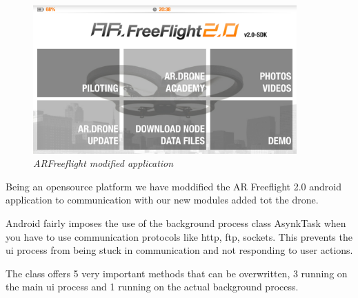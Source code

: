 \begin{figure}[ht]
\begin{center}
\includegraphics[width=0.9\textwidth]{implementation/android_app.png}
\end{center}
\caption{\small \itshape{ARFreeflight modified application}}
\end{figure}

Being an opensource platform we have moddified the AR Freeflight 2.0 android application to communication with our new modules added tot the drone.

Android fairly imposes the use of the background process class AsynkTask when you have to use communication protocols like http, ftp, sockets. This prevents the ui process from being stuck in communication and not responding to user actions. 

The class offers 5 very important methods that can be overwritten, 3 running on the main ui process and 1 running on the actual background process.

 

